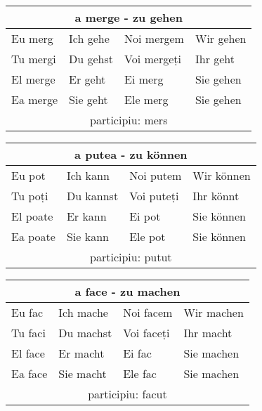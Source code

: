 \documentclass[11pt, oneside]{article}
\begin{document}
%
\begin{center}
  \begin{tabular}{ |p{3.25cm}|p{3.25cm}||p{3.25cm}|p{3.25cm}| }
      \hline
      \multicolumn{4}{|c|}{a merge - zu gehen} \\
      \hline
      \hline
      Eu merg & Ich gehe & Noi mergem & Wir gehen\\
      \hline
      Tu mergi & Du gehst & Voi mergeți & Ihr geht\\
      \hline
      El merge & Er geht & Ei merg & Sie gehen\\ 
      Ea merge & Sie geht & Ele merg & Sie gehen\\
      \hline
      \multicolumn{4}{|c|}{participiu: mers} \\
      \hline
     \end{tabular}
\end{center}
%
\begin{center}
  \begin{tabular}{ |p{3.25cm}|p{3.25cm}||p{3.25cm}|p{3.25cm}| }
      \hline
      \multicolumn{4}{|c|}{a putea - zu können} \\
      \hline
      \hline
      Eu pot & Ich kann & Noi putem & Wir können\\
      \hline
      Tu poți & Du kannst & Voi puteți & Ihr könnt\\
      \hline
      El poate & Er kann & Ei pot & Sie können\\ 
      Ea poate & Sie kann & Ele pot & Sie können\\
      \hline
      \multicolumn{4}{|c|}{participiu: putut} \\
      \hline
     \end{tabular}
\end{center}
%
\begin{center}
  \begin{tabular}{ |p{3.25cm}|p{3.25cm}||p{3.25cm}|p{3.25cm}| }
      \hline
      \multicolumn{4}{|c|}{a face - zu machen} \\
      \hline
      \hline
      Eu fac & Ich mache & Noi facem & Wir machen\\
      \hline
      Tu faci & Du machst & Voi faceți & Ihr macht\\
      \hline
      El face & Er macht & Ei fac & Sie machen\\ 
      Ea face & Sie macht & Ele fac & Sie machen\\
      \hline
      \multicolumn{4}{|c|}{participiu: facut} \\
      \hline
     \end{tabular}
\end{center}
\end{document}
